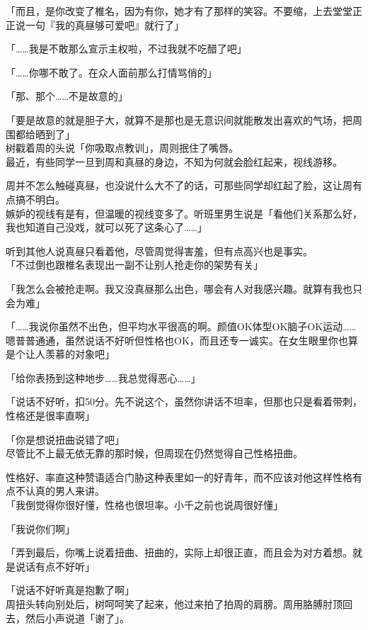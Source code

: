 「而且，是你改变了椎名，因为有你，她才有了那样的笑容。不要缩，上去堂堂正正说一句『我的真昼够可爱吧』就行了」

「……我是不敢那么宣示主权啦，不过我就不吃醋了吧」

「……你哪不敢了。在众人面前那么打情骂俏的」

「那、那个……不是故意的」

「要是故意的就是胆子大，就算不是那也是无意识间就能散发出喜欢的气场，把周围都给晒到了」\\

树戳着周的头说「你吸取点教训」，周则抿住了嘴唇。\\

最近，有些同学一旦到周和真昼的身边，不知为何就会脸红起来，视线游移。

周并不怎么触碰真昼，也没说什么大不了的话，可那些同学却红起了脸，这让周有点搞不明白。\\

嫉妒的视线有是有，但温暖的视线变多了。听班里男生说是「看他们关系那么好，我也知道自己没戏，就可以死了这条心了……」

听到其他人说真昼只看着他，尽管周觉得害羞，但有点高兴也是事实。\\

「不过倒也跟椎名表现出一副不让别人抢走你的架势有关」

「我怎么会被抢走啊。我又没真昼那么出色，哪会有人对我感兴趣。就算有我也只会为难」

「……我说你虽然不出色，但平均水平很高的啊。颜值OK体型OK脑子OK运动……嗯普普通通，虽然说话不好听但性格也OK，而且还专一诚实。在女生眼里你也算是个让人羡慕的对象吧」

「给你表扬到这种地步……我总觉得恶心……」

「说话不好听，扣50分。先不说这个，虽然你讲话不坦率，但那也只是看着带刺，性格还是很率直啊」

「你是想说扭曲说错了吧」\\

尽管比不上最无依无靠的那时候，但周现在仍然觉得自己性格扭曲。

性格好、率直这种赞语适合门胁这种表里如一的好青年，而不应该对他这样性格有点不认真的男人来讲。\\

「我倒觉得你很好懂，性格也很坦率。小千之前也说周很好懂」

「我说你们啊」

「弄到最后，你嘴上说着扭曲、扭曲的，实际上却很正直，而且会为对方着想。就是说话有点不好听」

「说话不好听真是抱歉了啊」\\

周扭头转向别处后，树呵呵笑了起来，他过来拍了拍周的肩膀。周用胳膊肘顶回去，然后小声说道「谢了」。
